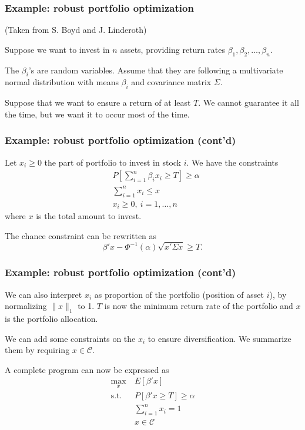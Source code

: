 \documentclass{beamer}
\begin{document}
\begin{frame}
\frametitle{Example: robust portfolio optimization}

(Taken from S. Boyd and J. Linderoth)

Suppose we want to invest in $n$ assets, providing return rates $\beta_1, \beta_2,\ldots, \beta_n$.

\mbox{}

The $\beta_i$'s are random variables.
Assume that they are following a multivariate normal distribution with means $\beta_i$ and covariance matrix $\Sigma$.

\mbox{}

Suppose that we want to ensure a return of at least $T$.
We cannot guarantee it all the time, but we want it to occur most of the time.

\end{frame}

\begin{frame}
\frametitle{Example: robust portfolio optimization (cont'd)}

Let $x_i \geq 0$ the part of portfolio to invest in stock $i$.
We have the constraints
\begin{align*}
& P\left[ \sum_{i = 1}^n \beta_i x_i \geq T  \right] \geq \alpha  \\
& \sum_{i = 1}^n x_i \leq x \\
& x_i \geq 0,\ i = 1,\ldots,n
\end{align*}
where $x$ is the total amount to invest.

\mbox{}

The chance constraint can be rewritten as
\[
\beta'x - \Phi^{-1}(\alpha) \sqrt{x'\Sigma x} \geq T.
\]


\end{frame}

\begin{frame}
\frametitle{Example: robust portfolio optimization (cont'd)}

We can also interpret $x_i$ as proportion of the portfolio (position of asset $i$), by normalizing $\| x \|_1$ to 1.
$T$ is now the minimum return rate of the portfolio and $x$ is the portfolio allocation.

\mbox{}

We can add some constraints on the $x_i$ to ensure diversification. We summarize them by requiring $x \in \mathcal{C}$.

\mbox{}

A complete program can now be expressed as
\begin{align*}
\max_x \ & E[\beta'x] \\
\mbox{s.t. } & P\left[ \beta' x \geq T \right] \geq \alpha  \\
& \sum_{i = 1}^n x_i = 1 \\
& x \in \mathcal{C}
\end{align*}

\end{frame}
\end{document}
